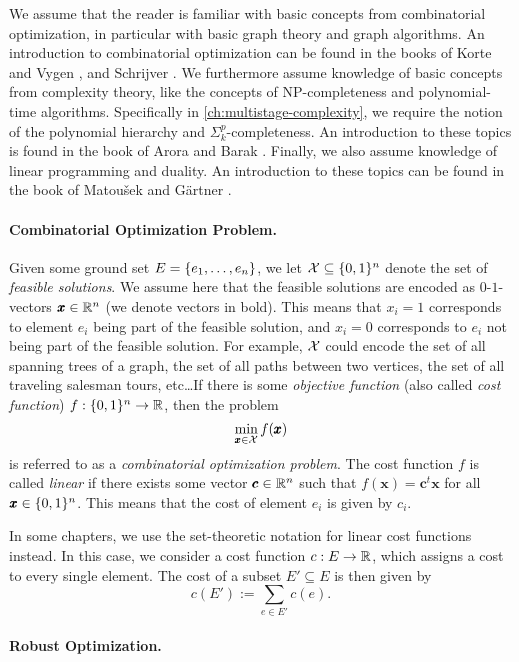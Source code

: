 We assume that the reader is familiar with basic concepts from combinatorial optimization, in particular with basic graph theory and graph algorithms. An introduction to combinatorial optimization can be found in the books of Korte and Vygen \cite{korte2006combinatorial}, and Schrijver \cite{schrijver2003combinatorial}. We furthermore assume knowledge of basic concepts from complexity theory, like the concepts of NP-completeness and polynomial-time algorithms. Specifically in \cref{ch:multistage-complexity}, we require the notion of the polynomial hierarchy and $\Sigma^p_k$-completeness. An introduction to these topics is found in the book of Arora and Barak \cite{arora2009computational}. Finally, we also assume knowledge of linear programming and duality. An introduction to these topics can be found in the book of Matou{\v{s}}ek and Gärtner \cite{matouvsek2007understanding}.

\paragraph*{Combinatorial Optimization Problem.}
Given some ground set $E = \{ e_1, \ldots, e_n \}$, we let $\mathcal{X} \subseteq \{ 0,1 \}^n$ denote the set of \emph{feasible solutions}. 
We assume here that the feasible solutions are encoded as $0$-$1$-vectors $\pmb x \in \mathbb{R}^n$ (we denote vectors in bold). This means that $x_i = 1$ corresponds to element $e_i$ being part of the feasible solution, and $x_i=0$ corresponds to $e_i$ not being part of the feasible solution. 
For example, $\mathcal{X}$ could encode the set of all spanning trees of a graph, the set of all paths between two vertices, the set of all traveling salesman tours, etc\dots If there is some \emph{objective function} (also called \emph{cost function}) $f : \{ 0,1 \}^n \to \mathbb{R}$, then the problem
\[
\min_{\pmb x \in \mathcal{X}} f(\pmb x)
\]
is referred to as a \emph{combinatorial optimization problem}. The cost function $f$ is called \emph{linear} if there exists some vector $\pmb c \in \mathbb{R}^n$ such that $f(\pmb x) = \pmb c^t \pmb x$ for all $\pmb x \in \{ 0,1 \}^n$. This means that the cost of element $e_i$ is given by $c_i$.

In some chapters, we use the set-theoretic notation for linear cost functions instead. In this case, we consider a cost function $c : E \to \mathbb{R}$, which assigns a cost to every single element. The cost of a subset $E' \subseteq E$ is then given by
\[ c(E') := \sum_{e \in E'}c(e). \]



\paragraph*{Robust Optimization.}

